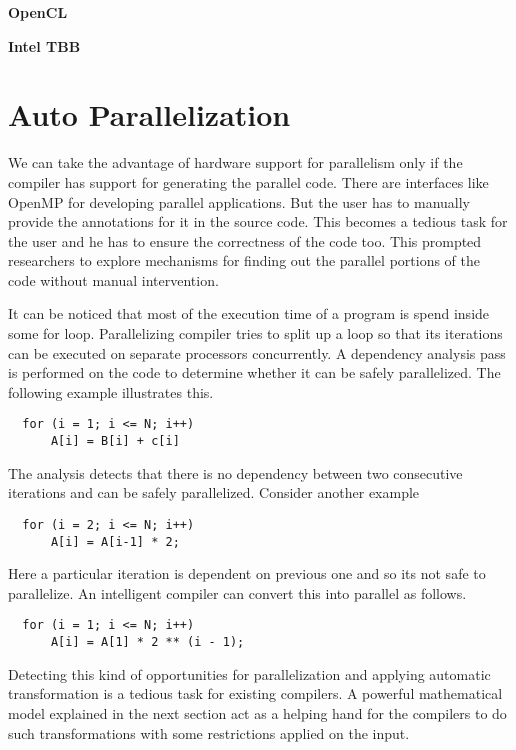 \documentclass[a4paper,12pt]{book}
\begin{document}
\textbf{OpenCL}

\textbf{Intel TBB}

\section{Auto Parallelization}
We can take the advantage of hardware support for parallelism only if the compiler has
support for generating the parallel code. There are interfaces like OpenMP for
developing parallel applications. But the user has to manually provide the annotations
for it in the source code. This becomes a tedious task for the user and he has to
ensure the correctness of the code too. This prompted researchers to explore
mechanisms for finding out the parallel portions of the code without manual intervention.

It can be noticed that most of the execution time of a program is spend inside some
for loop. Parallelizing compiler tries to split up a loop so that its iterations can
be executed on separate processors concurrently. A dependency analysis pass is 
performed on the code to determine whether it can be safely parallelized. The following
example illustrates this.

{\footnotesize
\begin{lstlisting}
  for (i = 1; i <= N; i++)
      A[i] = B[i] + c[i]
\end{lstlisting}
}

The analysis detects that there is no dependency between two consecutive iterations and
can be safely parallelized. Consider another example

{\footnotesize
\begin{lstlisting}
  for (i = 2; i <= N; i++)
      A[i] = A[i-1] * 2;
\end{lstlisting}
}

Here a particular iteration is dependent on previous one and so its not safe to parallelize.
An intelligent compiler can convert this into parallel as follows.

{\footnotesize
\begin{lstlisting}
  for (i = 1; i <= N; i++)
      A[i] = A[1] * 2 ** (i - 1);
\end{lstlisting}
}

Detecting this kind of opportunities for parallelization and applying automatic transformation
is a tedious task for existing compilers. A powerful mathematical model explained in the next
section act as a helping hand for the compilers to do such transformations with some
restrictions applied on the input.
\end{document}
